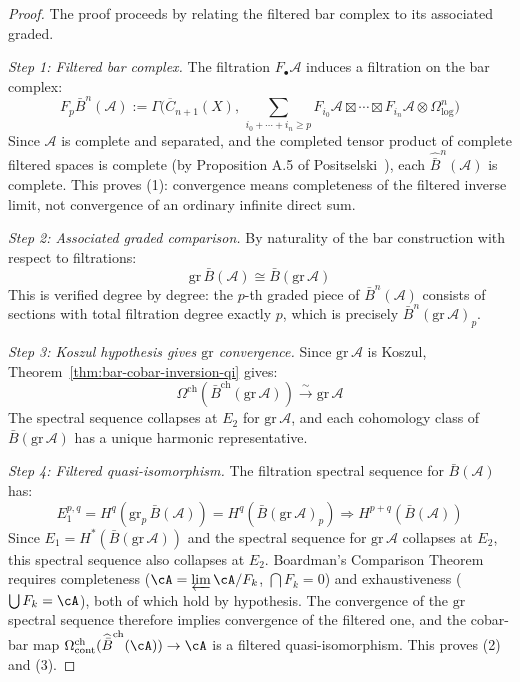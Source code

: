 \begin{proof}
The proof proceeds by relating the filtered bar complex to its associated graded.

\emph{Step 1: Filtered bar complex.}
The filtration $F_\bullet \mathcal{A}$ induces a filtration on the bar complex:
\[F_p \bar{B}^n(\mathcal{A}) := \Gamma\bigl(\overline{C}_{n+1}(X),\,
\textstyle\sum_{i_0 + \cdots + i_n \geq p}
F_{i_0}\mathcal{A} \boxtimes \cdots \boxtimes F_{i_n}\mathcal{A}
\otimes \Omega^n_{\log}\bigr)\]
Since $\mathcal{A}$ is complete and separated, and the completed
tensor product of complete filtered spaces is complete (by
Proposition A.5 of Positselski~\cite{Positselski11}), each
$\widehat{\bar{B}}^n(\mathcal{A})$ is complete. This proves (1):
convergence means completeness of the filtered inverse limit, not
convergence of an ordinary infinite direct sum.

\emph{Step 2: Associated graded comparison.}
By naturality of the bar construction with respect to filtrations:
\[\mathrm{gr}\,\bar{B}(\mathcal{A}) \cong \bar{B}(\mathrm{gr}\,\mathcal{A})\]
This is verified degree by degree: the $p$-th graded piece of $\bar{B}^n(\mathcal{A})$
consists of sections with total filtration degree exactly $p$, which is precisely
$\bar{B}^n(\mathrm{gr}\,\mathcal{A})_p$.

\emph{Step 3: Koszul hypothesis gives $\mathrm{gr}$ convergence.}
Since $\mathrm{gr}\,\mathcal{A}$ is Koszul, Theorem~\ref{thm:bar-cobar-inversion-qi} gives:
\[\Omega^{\mathrm{ch}}(\bar{B}^{\mathrm{ch}}(\mathrm{gr}\,\mathcal{A}))
\xrightarrow{\sim} \mathrm{gr}\,\mathcal{A}\]
The spectral sequence collapses at $E_2$ for $\mathrm{gr}\,\mathcal{A}$, and
each cohomology class of $\bar{B}(\mathrm{gr}\,\mathcal{A})$ has a unique harmonic
representative.

\emph{Step 4: Filtered quasi-isomorphism.}
The filtration spectral sequence for $\bar{B}(\mathcal{A})$ has:
\[E_1^{p,q} = H^q(\mathrm{gr}_p\,\bar{B}(\mathcal{A})) =
H^q(\bar{B}(\mathrm{gr}\,\mathcal{A})_p) \Longrightarrow
H^{p+q}(\bar{B}(\mathcal{A}))\]
Since $E_1 = H^*(\bar{B}(\mathrm{gr}\,\mathcal{A}))$ and the spectral sequence for
$\mathrm{gr}\,\mathcal{A}$ collapses at $E_2$, this spectral sequence also collapses
at $E_2$. Boardman's Comparison Theorem \cite{Boardman-conditional}
requires completeness ($\cA = \varprojlim \cA/F_k$, $\bigcap F_k = 0$)
and exhaustiveness ($\bigcup F_k = \cA$), both of which hold by
hypothesis. The convergence of the $\mathrm{gr}$ spectral sequence
therefore implies convergence of the filtered one, and the cobar-bar
map
$\Omega^{\mathrm{ch}}_{\mathrm{cont}}
(\widehat{\bar{B}}^{\mathrm{ch}}(\cA)) \to \cA$
is a filtered quasi-isomorphism. This proves (2) and (3).


\end{proof}
